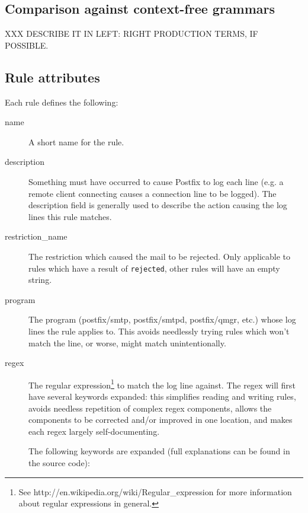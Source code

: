 \documentclass[a4paper,12pt,draft]{article}
\begin{document}
\subsection{Comparison against context-free grammars}

\label{comparison against context-free grammars}

XXX DESCRIBE IT IN LEFT: RIGHT PRODUCTION TERMS, IF POSSIBLE.

\subsection{Rule attributes}

Each rule defines the following:

\begin{description}

    \item [name] A short name for the rule.

    \item [description] Something must have occurred to cause Postfix to
        log each line (e.g. a remote client connecting causes a connection
        line to be logged).  The description field is generally used to
        describe the action causing the log lines this rule matches.

    \item [restriction\_name] The restriction which caused the mail to be
        rejected.  Only applicable to rules which have a result of
        \texttt{rejected}, other rules will have an empty string.

    \item [program] The program (postfix/smtp, postfix/smtpd, postfix/qmgr,
        etc.) whose log lines the rule applies to.  This avoids needlessly
        trying rules which won't match the line, or worse, might match
        unintentionally.

    \item [regex] The regular expression\footnote{See
        http://en.wikipedia.org/wiki/Regular\_expression for more
        information about regular expressions in general.} to match the log
        line against.  The regex will first have several keywords expanded:
        this simplifies reading and writing rules, avoids needless
        repetition of complex regex components, allows the components
        to be corrected and/or improved in one location, and makes each
        regex largely self-documenting.
        
        The following keywords are expanded (full explanations can be found
        in the source code):


\end{description}
\end{document}
